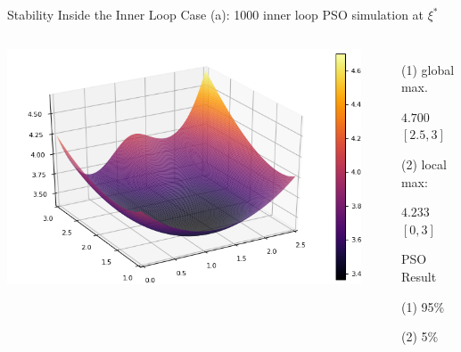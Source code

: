 \documentclass{beamer}
\begin{document}
\begin{frame}{Stability Inside the Inner Loop}
  Case (a): 1000 inner loop PSO simulation at $\xi^*$\\
  \begin{columns}
    \begin{center}
      \includegraphics[scale=0.5]{surfacea.png}
    \end{center}
    \begin{itemize}
      \item[(1)] global max.
      \item[] $4.700$ $[2.5,3]$
      \item[(2)] local max:
      \item[] $4.233$ $[0,3]$
      \vspace{5mm}
      \item[] PSO Result
      \item[(1)] 95\% 
      \item[(2)] 5\%
    \end{itemize}
  \end{columns}
\end{frame}
\end{document}
